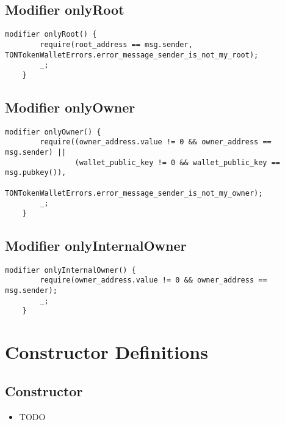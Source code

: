 \subsection{Modifier onlyRoot}


\begin{lstlisting}[firstnumber=598]
    modifier onlyRoot() {
        require(root_address == msg.sender, TONTokenWalletErrors.error_message_sender_is_not_my_root);
        _;
    }
\end{lstlisting}

\subsection{Modifier onlyOwner}


\begin{lstlisting}[firstnumber=603]
    modifier onlyOwner() {
        require((owner_address.value != 0 && owner_address == msg.sender) ||
                (wallet_public_key != 0 && wallet_public_key == msg.pubkey()),
                TONTokenWalletErrors.error_message_sender_is_not_my_owner);
        _;
    }
\end{lstlisting}

\subsection{Modifier onlyInternalOwner}


\begin{lstlisting}[firstnumber=610]
    modifier onlyInternalOwner() {
        require(owner_address.value != 0 && owner_address == msg.sender);
        _;
    }
\end{lstlisting}

\section{Constructor Definitions}


\subsection{Constructor}

\noindent\begin{itemize}
\item TODO
\end{itemize}

